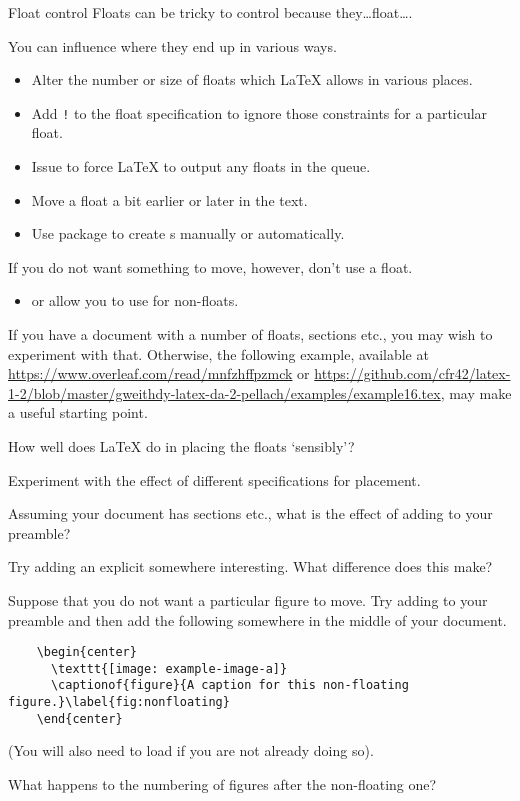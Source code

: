 \begin{frame}{Float control}
	Floats can be tricky to control because they\dots float\dots.

	You can influence where they end up in various ways.
	  \begin{itemize}
		\item Alter the number or size of floats which \LaTeX{} allows in various places.
		\item Add \texttt{!} to the float specification to ignore those constraints for a particular float.
		\item Issue  to force \LaTeX{} to output any floats in the queue.
		\item Move a float a bit earlier or later in the text.
        \item Use package  to create s manually or automatically.
	  \end{itemize}

	If you do not want something to move, however, don't use a float.
	\begin{itemize}
	  \item {} or  allow you to use  for non-floats.
	\end{itemize}
\end{frame}

\begin{exercise}
  \label{ex:floatmanagement}%
  If you have a document with a number of floats, sections etc., you may wish to experiment with that.
  Otherwise, the following example, available at \url{https://www.overleaf.com/read/mnfzhffpzmck} or \url{https://github.com/cfr42/latex-1-2/blob/master/gweithdy-latex-da-2-pellach/examples/example16.tex}, may make a useful starting point.
  

  How well does \LaTeX{} do in placing the floats ‘sensibly’?

  Experiment with the effect of different specifications for placement.

  Assuming your document has sections etc., what is the effect of adding  to your preamble?

  Try adding an explicit  somewhere interesting.
  What difference does this make?

  Suppose that you do not want a particular figure to move.
  Try adding  to your preamble and then add the following somewhere in the middle of your document.
  \begin{verbatim}
    \begin{center}
      \texttt{[image: example-image-a]}
      \captionof{figure}{A caption for this non-floating figure.}\label{fig:nonfloating}
    \end{center}
  \end{verbatim}
  (You will also need to load  if you are not already doing so).

  What happens to the numbering of figures after the non-floating one?
\end{exercise}

